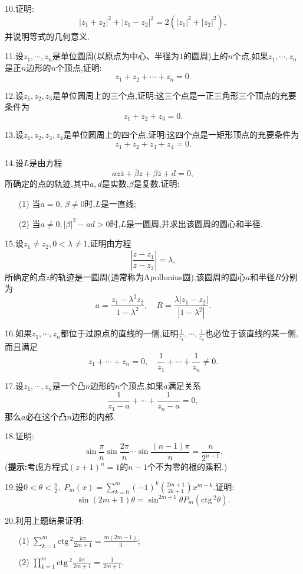 \documentclass[12pt,fontset=none]{ctexbook}
\newcommand{\Lin}[1]{\overline{#1}}
\renewcommand{\rm}[1]{\mathrm{#1}\,}
\begin{document}
10.证明:
$$|z_{1}+z_{2}|^{2}+|z_{1}-z_{2}|^{2}=2(|z_{1}|^{2}+|z_{2}|^{2}),$$
并说明等式的几何意义.

11.设$z_{1},\cdots,z_{n}$是单位圆周(以原点为中心、半径为$1$的圆周)上的$n$个点,如果$z_{1},\cdots,z_{n}$是正$n$边形的$n$个顶点,证明:
$$z_{1}+z_{2}+\cdots+z_{n}=0.$$

12.设$z_{1},z_{2},z_{3}$是单位圆周上的三个点,证明:这三个点是一正三角形三个顶点的充要条件为
$$z_{1}+z_{2}+z_{3}=0.$$

13.设$z_{1},z_{2},z_{3},z_{4}$是单位圆周上的四个点,证明:这四个点是一矩形顶点的充要条件为
$$z_{1}+z_{2}+z_{3}+z_{4}=0.$$


14.设$L$是由方程
$$az\Lin{z}+\Lin{\beta}z+\beta \Lin{z} +d=0,$$
所确定的点的轨迹,其中$a,d$是实数,$\beta$是复数.证明:
\begin{enumerate}
  \item[(1)] 当$a=0,\, \beta \neq 0$时,$L$是一直线;
  \item[(2)] 当$a \neq 0,|\beta|^{2}-ad > 0$时,$L$是一圆周,并求出该圆周的圆心和半径.  
\end{enumerate}


15.设$z_{1}\neq z_{2},0< \lambda \neq 1$,证明由方程
$$\left|\frac{z-z_{1}}{z-z_{2}}\right|=\lambda,$$
所确定的点$z$的轨迹是一圆周(通常称为Apollonius圆),该圆周的圆心$a$和半径$R$分别为
$$a=\frac{z_{1}-\lambda^{2}z_{2}}{1-\lambda^{2}},\quad R=\frac{\lambda|z_{1}-z_{2}|}{|1-\lambda^{2}|}.$$


16.如果$z_{1},\cdots,z_{n}$都位于过原点的直线的一侧,证明$\frac{1}{z_{1}},\cdots,\frac{1}{z_{n}}$也必位于该直线的某一侧,而且满足
$$z_{1}+\cdots+z_{n}=0,\quad \frac{1}{z_{1}}+\cdots + \frac{1}{z_{n}}\neq 0.$$


17.设$z_{1},\cdots,z_{n}$是一个凸$n$边形的$n$个顶点,如果$a$满足关系
$$\frac{1}{z_{1}-a}+\cdots+\frac{1}{z_{n}-a}=0,$$
那么$a$必在这个凸$n$边形的内部.


18.证明:
$$\sin \frac{\pi}{n}\sin\frac{2\pi}{n}\cdots\sin\frac{(n-1)\pi}{n}=\frac{n}{2^{n-1}}.$$
(\textbf{提示:}考虑方程式$(z+1)^{n}=1$的$n-1$个不为零的根的乘积.)

19.设$0<\theta < \frac{\pi}{2},\; P_{m}(x)=\sum\limits_{k=0}^{m}(-1)^{k}\binom{2m+1}{2k+1}x^{m-k} $.证明:
$$\sin(2m+1)\theta=\sin^{2m+1}\theta P_{m}(\rm{ctg}^{2}\theta).$$

20.利用上题结果证明:
\begin{enumerate}
  \item[(1)] $\sum\limits_{k=1}^{m} \rm{ctg}^{2}\frac{k\pi}{2m+1}=\frac{m(2m-1)}{3}$;
  \item[(2)] $\prod\limits_{k=1}^{m}\rm{ctg}^{2}\frac{k\pi}{2m+1}=\frac{1}{2m+1}$.  
\end{enumerate}
\end{document}
